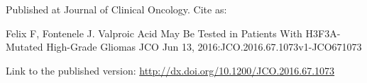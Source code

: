Published at Journal of Clinical Oncology. Cite as:

Felix F, Fontenele J. Valproic Acid May Be Tested in Patients With H3F3A-Mutated High-Grade Gliomas
JCO Jun 13, 2016:JCO.2016.67.1073v1-JCO671073

Link to the published version: \href{http://dx.doi.org/10.1200/JCO.2016.67.1073}{http://dx.doi.org/10.1200/JCO.2016.67.1073}